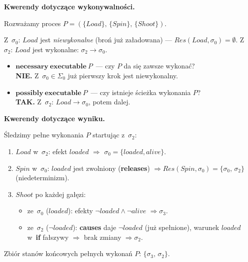 \documentclass[11pt,a4paper]{article}
\newcommand{\causes}{\textbf{causes}}
\renewcommand{\iff}{\textbf{if}}
\newcommand{\releases}{\textbf{releases}}
\newcommand{\necessary}{\textbf{necessary}}
\newcommand{\possibly}{\textbf{possibly}}
\newcommand{\executable}{\textbf{executable}}
\begin{document}
\medskip
\noindent\textbf{Kwerendy dotyczące wykonywalności.}

Rozważamy proces $P = (\{\mathit{Load}\},\,\{\mathit{Spin}\},\,\{\mathit{Shoot}\})$.

Z~$\sigma_0$: $\mathit{Load}$ jest \emph{niewykonalne} (broń już załadowana)
--- $\mathit{Res}(\mathit{Load},\sigma_0)=\emptyset$.
Z~$\sigma_2$: $\mathit{Load}$ jest wykonalne: $\sigma_2 \to \sigma_0$.

\begin{itemize}
  \item $\necessary\ \executable\ P$~---
    czy $P$ da się zawsze wykonać?\\
    \textbf{NIE.} Z~$\sigma_0 \in \Sigma_0$ już pierwszy krok jest niewykonalny.

  \item $\possibly\ \executable\ P$~---
    czy istnieje ścieżka wykonania $P$?\\
    \textbf{TAK.} Z~$\sigma_2$: $\mathit{Load} \to \sigma_0$, potem dalej.
\end{itemize}

\medskip
\noindent\textbf{Kwerendy dotyczące wyniku.}

Śledzimy pełne wykonania $P$ startując z~$\sigma_2$:

\begin{enumerate}
  \item $\mathit{Load}$ w~$\sigma_2$: efekt $\mathit{loaded}$ $\Rightarrow$ $\sigma_0 = \{\mathit{loaded},\mathit{alive}\}$.
  \item $\mathit{Spin}$ w~$\sigma_0$: $\mathit{loaded}$ jest zwolniony (\releases{})
        $\Rightarrow \mathit{Res}(\mathit{Spin},\sigma_0) = \{\sigma_0,\,\sigma_2\}$
        (niedeterminizm).
  \item $\mathit{Shoot}$ po każdej gałęzi:
    \begin{itemize}
      \item ze~$\sigma_0$ ($\mathit{loaded}$): efekty $\neg\mathit{loaded}\land\neg\mathit{alive}$
            $\Rightarrow \sigma_3$.
      \item ze~$\sigma_2$ ($\neg\mathit{loaded}$): \causes{} daje $\neg\mathit{loaded}$
            (już spełnione), warunek $\mathit{loaded}$ w~\iff{} fałszywy
            $\Rightarrow$ brak zmiany $\Rightarrow \sigma_2$.
    \end{itemize}
\end{enumerate}

Zbiór stanów końcowych pełnych wykonań $P$: $\{\sigma_3,\,\sigma_2\}$.
\end{document}
